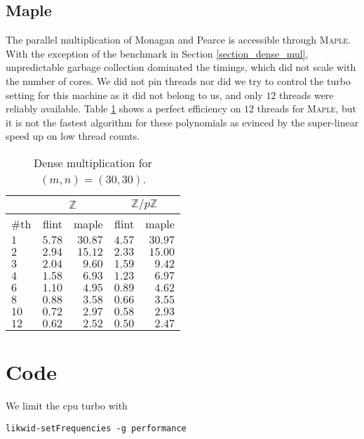 \documentclass{deliverablereport}
\begin{document}
\subsection{Maple}
The parallel multiplication of Monagan and Pearce \cite{Monagan:2009:PSP:1576702.1576739} is accessible through \textsc{Maple}. With the exception of the benchmark in Section \ref{section_dense_mul}, unpredictable garbage collection dominated the timings, which did not scale with the number of cores. We did not pin threads nor did we try to control the turbo setting for this machine as it did not belong to us, and only $12$ threads were reliably available. Table \ref{table_maple} shows a perfect efficiency on $12$ threads for \textsc{Maple}, but it is not the fastest algorithm for these polynomials as evinced by the super-linear speed up on low thread counts.

\begin{table}[htb]
\begin{tabular}{l | r | r | r | r | }
 & \multicolumn{2}{|c|}{$\mathbb{Z}$} & \multicolumn{2}{|c|}{$\mathbb{Z}/p \mathbb{Z}$} \\ \hline
\#th   & flint & maple & flint & maple\\ \hline
$1$   & $5.78$ & $30.87$  &$4.57$ & $30.97$\\ \hline
$2$   & $2.94$ & $15.12$  &$2.33$ & $15.00$\\ \hline
$3$   & $2.04$ & $9.60$   &$1.59$ & $9.42$\\ \hline
$4$   & $1.58$ & $6.93$   &$1.23$ & $6.97$\\ \hline
$6$   & $1.10$ & $4.95$   &$0.89$ & $4.62$\\ \hline
$8$   & $0.88$ & $3.58$   &$0.66$ & $3.55$\\ \hline
$10$  & $0.72$ & $2.97$   &$0.58$ & $2.93$\\ \hline
$12$  & $0.62$ & $2.52$   &$0.50$ & $2.47$\\ \hline
\end{tabular}
\caption{Dense multiplication for $(m, n) = (30, 30)$.}
\label{table_maple}
\end{table}


\section{Code}
\label{section_code}

We limit the cpu turbo with
\begin{verbatim}
likwid-setFrequencies -g performance
\end{verbatim}
\end{document}
